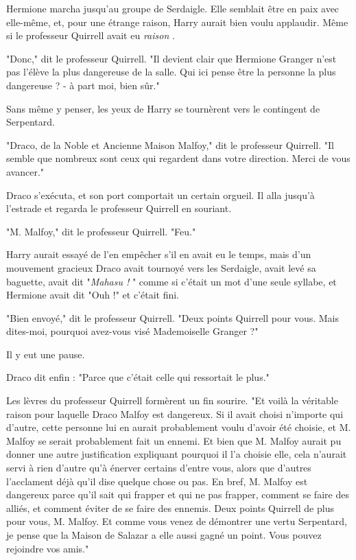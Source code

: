 Hermione marcha jusqu'au groupe de Serdaigle. Elle semblait être en paix avec elle-même, et, pour une étrange raison, Harry aurait bien voulu applaudir. Même si le professeur Quirrell avait eu \emph{raison} .

"Donc," dit le professeur Quirrell. "Il devient clair que Hermione Granger n'est pas l'élève la plus dangereuse de la salle. Qui ici pense être la personne la plus dangereuse ? - à part moi, bien sûr."

Sans même y penser, les yeux de Harry se tournèrent vers le contingent de Serpentard.

"Draco, de la Noble et Ancienne Maison Malfoy," dit le professeur Quirrell. "Il semble que nombreux sont ceux qui regardent dans votre direction. Merci de vous avancer."

Draco s'exécuta, et son port comportait un certain orgueil. Il alla jusqu'à l'estrade et regarda le professeur Quirrell en souriant.

"M. Malfoy," dit le professeur Quirrell. "Feu."

Harry aurait essayé de l'en empêcher s'il en avait eu le temps, mais d'un mouvement gracieux Draco avait tournoyé vers les Serdaigle, avait levé sa baguette, avait dit "\emph{Mahasu !} " comme si c'était un mot d'une seule syllabe, et Hermione avait dit "Ouh !" et c'était fini.

"Bien envoyé," dit le professeur Quirrell. "Deux points Quirrell pour vous. Mais dites-moi, pourquoi avez-vous visé Mademoiselle Granger ?"

Il y eut une pause.

Draco dit enfin : "Parce que c'était celle qui ressortait le plus."

Les lèvres du professeur Quirrell formèrent un fin sourire. "Et voilà la véritable raison pour laquelle Draco Malfoy est dangereux. Si il avait choisi n'importe qui d'autre, cette personne lui en aurait probablement voulu d'avoir été choisie, et M. Malfoy se serait probablement fait un ennemi. Et bien que M. Malfoy aurait pu donner une autre justification expliquant pourquoi il l'a choisie elle, cela n'aurait servi à rien d'autre qu'à énerver certains d'entre vous, alors que d'autres l'acclament déjà qu'il dise quelque chose ou pas. En bref, M. Malfoy est dangereux parce qu'il sait qui frapper et qui ne pas frapper, comment se faire des alliés, et comment éviter de se faire des ennemis. Deux points Quirrell de plus pour vous, M. Malfoy. Et comme vous venez de démontrer une vertu Serpentard, je pense que la Maison de Salazar a elle aussi gagné un point. Vous pouvez rejoindre vos amis."

